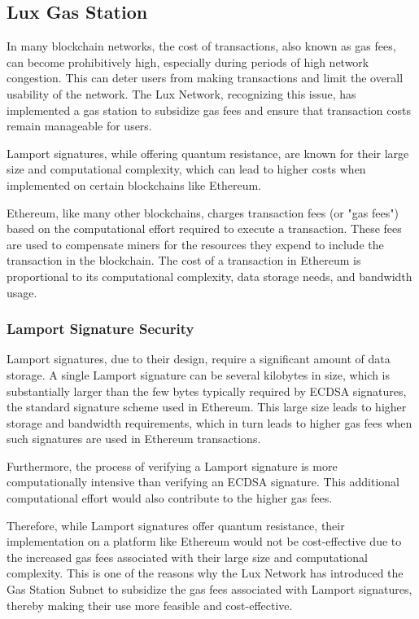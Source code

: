 \documentclass[11pt]{article}
\begin{document}
\subsection{Lux Gas Station}

In many blockchain networks, the cost of transactions, also known as gas fees, can become prohibitively high, especially during periods of high network congestion. This can deter users from making transactions and limit the overall usability of the network. The Lux Network, recognizing this issue, has implemented a gas station to subsidize gas fees and ensure that transaction costs remain manageable for users.


Lamport signatures, while offering quantum resistance, are known for their large size and computational complexity, which can lead to higher costs when implemented on certain blockchains like Ethereum.


Ethereum, like many other blockchains, charges transaction fees (or "gas fees") based on the computational effort required to execute a transaction. These fees are used to compensate miners for the resources they expend to include the transaction in the blockchain. The cost of a transaction in Ethereum is proportional to its computational complexity, data storage needs, and bandwidth usage.


\subsubsection{Lamport Signature Security}

Lamport signatures, due to their design, require a significant amount of data storage. A single Lamport signature can be several kilobytes in size, which is substantially larger than the few bytes typically required by ECDSA signatures, the standard signature scheme used in Ethereum. This large size leads to higher storage and bandwidth requirements, which in turn leads to higher gas fees when such signatures are used in Ethereum transactions.


Furthermore, the process of verifying a Lamport signature is more computationally intensive than verifying an ECDSA signature. This additional computational effort would also contribute to the higher gas fees.


Therefore, while Lamport signatures offer quantum resistance, their implementation on a platform like Ethereum would not be cost-effective due to the increased gas fees associated with their large size and computational complexity. This is one of the reasons why the Lux Network has introduced the Gas Station Subnet to subsidize the gas fees associated with Lamport signatures, thereby making their use more feasible and cost-effective.
\end{document}
